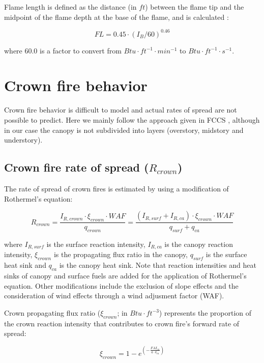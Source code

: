 \documentclass[]{book}
\begin{document}
Flame length is defined as the distance (in \(ft\)) between the flame
tip and the midpoint of the flame depth at the base of the flame, and is
calculated \citep{Byram1959}:

\begin{equation}
FL = 0.45 \cdot (I_B/60)^{0.46}
\end{equation}

where 60.0 is a factor to convert from
\(Btu\cdot ft^{-1} \cdot min^{-1}\) to
\(Btu\cdot ft^{-1} \cdot s^{-1}\).

\section{Crown fire behavior}\label{crown-fire-behavior}

Crown fire behavior is difficult to model and actual rates of spread are
not possible to predict. Here we mainly follow the approach given in
FCCS \citep{Prichard2013}, although in our case the canopy is not
subdivided into layers (overstory, midstory and understory).

\subsection{Crown fire rate of spread ($R_{crown}$)}

The rate of spread of crown fires is estimated by using a modification
of Rothermel's equation:

\begin{equation}
R_{crown} = \frac{I_{R,crown} \cdot \xi_{crown}\cdot WAF}{q_{crown}} = \frac{(I_{R,surf}+I_{R,ca}) \cdot \xi_{crown}\cdot WAF}{q_{surf}+q_{ca}}
\end{equation}

where \(I_{R,surf}\) is the surface reaction intensity, \(I_{R,ca}\) is
the canopy reaction intensity, \(\xi_{crown}\) is the propagating flux
ratio in the canopy, \(q_{surf}\) is the surface heat sink and
\(q_{ca}\) is the canopy heat sink. Note that reaction intensities and
heat sinks of canopy and surface fuels are added for the application of
Rothermel's equation. Other modifications include the exclusion of slope
effects and the consideration of wind effects through a wind adjusment
factor (WAF).

Crown propagating flux ratio (\(\xi_{crown}\); in \(Btu \cdot ft^{-3}\))
represents the proportion of the crown reaction intensity that
contributes to crown fire's forward rate of spread:

\begin{equation}
\xi_{crown} = 1 - e^{\left(-\frac{FAI_{ca}}{4 \cdot \delta_{ca}}\right)}
\end{equation}
\end{document}
